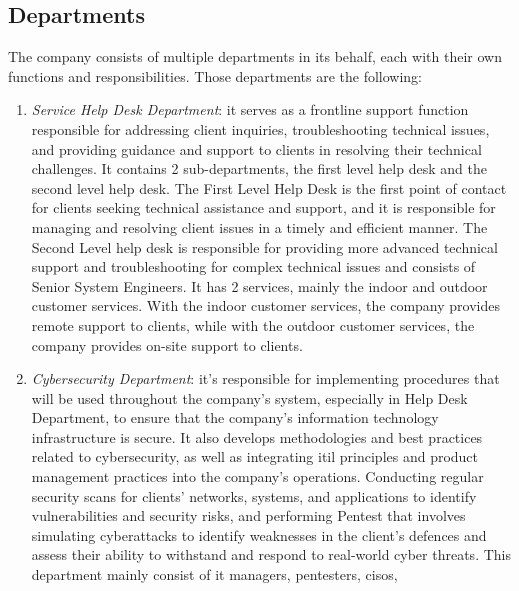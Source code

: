 \begin{multicols}{2}
      \subsection{Departments}
      The company consists of multiple departments in its behalf, each with their own functions and responsibilities.
      Those departments are the following:
      \begin{enumerate}
            \item \textit{Service Help Desk Department}: it serves as a frontline support function responsible for
                  addressing client inquiries, troubleshooting technical issues, and providing guidance and support
                  to clients in resolving their technical challenges. It contains 2 sub-departments, the first level
                  help desk and the second level help desk. The First Level Help Desk is the first point of contact
                  for clients seeking technical assistance and support, and it is responsible for managing and
                  resolving client issues in a timely and efficient manner. The Second Level help desk is
                  responsible for providing more advanced technical support and troubleshooting for complex
                  technical issues and consists of Senior System Engineers. It has 2 services, mainly the indoor
                  and outdoor customer services. With the indoor customer services, the company provides remote
                  support to clients, while with the outdoor customer services, the company provides on-site
                  support to clients.
            \item \textit{Cybersecurity Department}: it's responsible for implementing procedures that will be used
                  throughout the company's system, especially in Help Desk Department, to ensure that the company's
                  information technology infrastructure is secure. It also develops methodologies and best practices
                  related to cybersecurity, as well as integrating \acrshort{itil} principles and product management
                  practices into the company's operations. Conducting regular security scans for clients' networks,
                  systems, and applications to identify vulnerabilities and security risks, and performing
                  \gls{Pentest} that involves simulating cyberattacks to identify weaknesses in the client's
                  defences and assess their ability to withstand and respond to real-world cyber threats. This
                  department mainly consist of \acrshort{it} managers, \acrshort{pentest}ers, \acrshort{ciso}s,

\end{enumerate}
\end{multicols}
